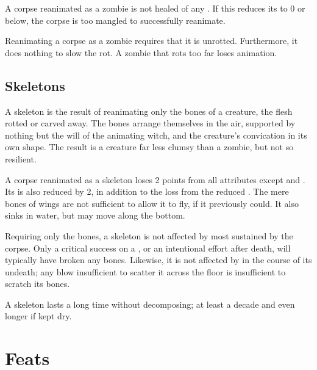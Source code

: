 A corpse reanimated as a zombie is not healed of any {\damage}.
If this reduces its  to 0 or below, the corpse is too mangled to successfully reanimate.

Reanimating a corpse as a zombie requires that it is unrotted.
Furthermore, it does nothing to slow the rot.
A zombie that rots too far loses animation.

\subsection{Skeletons}

A skeleton is the result of reanimating only the bones of a creature, the flesh rotted or carved away.
The bones arrange themselves in the air, supported by nothing but the will of the animating witch, and the creature's convication in its own shape.
The result is a creature far less clumsy than a zombie, but not so resilient.

A corpse reanimated as a skeleton loses 2 points from all attributes except  and .
Its  is also reduced by 2, in addition to the loss from the reduced .
The mere bones of wings are not sufficient to allow it to fly, if it previously could.
It also sinks in water, but may move along the bottom.

Requiring only the bones, a skeleton is not affected by most {\damage} sustained by the corpse.
Only a critical success on a , or an intentional effort after death, will typically have broken any bones.
Likewise, it is not affected by {\damage} in the course of its undeath; any blow insufficient to scatter it across the floor is insufficient to scratch its bones.

A skeleton lasts a long time without decomposing; at least a decade and even longer if kept dry.

\section{Feats}


